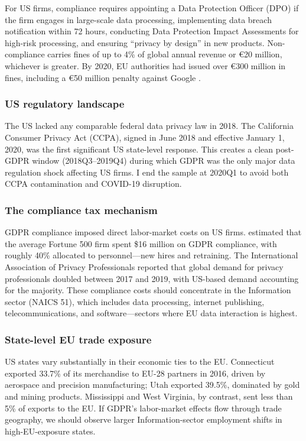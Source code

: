 \documentclass[12pt]{article}
\begin{document}
For US firms, compliance requires appointing a Data Protection Officer (DPO) if the firm engages in large-scale data processing, implementing data breach notification within 72 hours, conducting Data Protection Impact Assessments for high-risk processing, and ensuring ``privacy by design'' in new products. Non-compliance carries fines of up to 4\% of global annual revenue or \euro{}20 million, whichever is greater. By 2020, EU authorities had issued over \euro{}300 million in fines, including a \euro{}50 million penalty against Google \citep{CNIL2019}.

\subsubsection*{US regulatory landscape} The US lacked any comparable federal data privacy law in 2018. The California Consumer Privacy Act (CCPA), signed in June 2018 and effective January 1, 2020, was the first significant US state-level response. This creates a clean post-GDPR window (2018Q3--2019Q4) during which GDPR was the only major data regulation shock affecting US firms. I end the sample at 2020Q1 to avoid both CCPA contamination and COVID-19 disruption.

\subsubsection*{The compliance tax mechanism} GDPR compliance imposed direct labor-market costs on US firms. \citet{IAPP2019} estimated that the average Fortune 500 firm spent \$16 million on GDPR compliance, with roughly 40\% allocated to personnel---new hires and retraining. The International Association of Privacy Professionals reported that global demand for privacy professionals doubled between 2017 and 2019, with US-based demand accounting for the majority. These compliance costs should concentrate in the Information sector (NAICS 51), which includes data processing, internet publishing, telecommunications, and software---sectors where EU data interaction is highest.

\subsubsection*{State-level EU trade exposure} US states vary substantially in their economic ties to the EU. Connecticut exported 33.7\% of its merchandise to EU-28 partners in 2016, driven by aerospace and precision manufacturing; Utah exported 39.5\%, dominated by gold and mining products. Mississippi and West Virginia, by contrast, sent less than 5\% of exports to the EU. If GDPR's labor-market effects flow through trade geography, we should observe larger Information-sector employment shifts in high-EU-exposure states.
\end{document}
